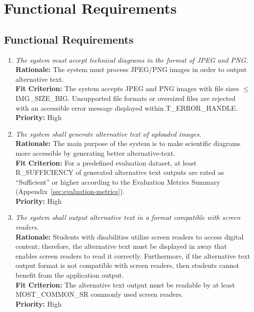 \documentclass[12pt]{article}
\begin{document}
\section{Functional Requirements}
\subsection{Functional Requirements}
\begin{enumerate}[label=FR \arabic*., wide=0pt, leftmargin=*]
  \item \emph{The system must accept technical diagrams in the format
    of JPEG and PNG.}\\[2mm]
    {\bf Rationale:} The system must process JPEG/PNG images in order
    to output alternative text. \\
   {\bf Fit Criterion:} The system accepts JPEG and PNG images with file sizes $\leq$ IMG\_SIZE\_BIG. 
   Unsupported file formats or oversized files are rejected 
   with an accessible error message displayed within T\_ERROR\_HANDLE.\\
    {\bf Priority:} High
  \item \emph{The system shall generate alternative text of uploaded
    images.}\\[2mm]
    {\bf Rationale:} The main purpose of the system is to make
    scientific diagrams more accessible by generating better
    alternative-text. \\
    {\bf Fit Criterion:} For a predefined evaluation dataset, 
    at least R\_SUFFICIENCY of generated alternative text outputs are rated as “Sufficient” or higher according to the Evaluation Metrics Summary (Appendix~\ref{sec:evaluation-metrics}).\\
    {\bf Priority:} High
  \item \emph{The system shall output alternative text in a format
    compatible with screen readers.}\\[2mm]
    {\bf Rationale:} Students with disabilities utilize screen
    readers to access digital content; therefore, the alternative
    text must be displayed in away that enables screen readers to
    read it correctly. Furthermore, if the alternative text output
    format is not compatible with screen readers, then students
    cannot benefit from the application output.\\
    {\bf Fit Criterion:} The alternative text output must be readable
    by at least MOST\_COMMON\_SR commonly used screen readers.\\
    {\bf Priority:} High

\end{enumerate}
\end{document}
